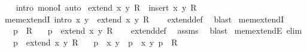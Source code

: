 \begin{isabellebody}
%
\isadelimproof
\ \ %
\endisadelimproof
%
\isatagproof
{}\isamarkupfalse%
\ {\isacharparenleft}{\kern0pt}intro\ monoI{\isacharparenright}{\kern0pt}\ auto%
\endisatagproof
{\isafoldproof}%
%
\isadelimproof
%
\endisadelimproof
%
\isadelimdocument
%
\endisadelimdocument
%
\isatagdocument
%
\isamarkuptrue%
%
\endisatagdocument
{\isafolddocument}%
%
\isadelimdocument
%
\endisadelimdocument
{}\isamarkupfalse%
\ {\isachardoublequoteopen}extend\ x\ y\ R\ {\isasymequiv}\ insert\ {\isasymlangle}x{\isacharcomma}{\kern0pt}\ y{\isasymrangle}\ R{\isachardoublequoteclose}\isanewline
\isanewline
{}\isamarkupfalse%
\ mem{\isacharunderscore}{\kern0pt}extendI\ {\isacharbrackleft}{\kern0pt}intro{\isacharbrackright}{\kern0pt}{\isacharcolon}{\kern0pt}\ {\isachardoublequoteopen}{\isasymlangle}x{\isacharcomma}{\kern0pt}\ y{\isasymrangle}\ {\isasymin}\ extend\ x\ y\ R{\isachardoublequoteclose}\isanewline
%
\isadelimproof
\ \ %
\endisadelimproof
%
\isatagproof
{}\isamarkupfalse%
\ extend{\isacharunderscore}{\kern0pt}def\ \isamarkupfalse%
\ blast%
\endisatagproof
{\isafoldproof}%
%
\isadelimproof
\isanewline
%
\endisadelimproof
\isanewline
{}\isamarkupfalse%
\ mem{\isacharunderscore}{\kern0pt}extendI{\isacharprime}{\kern0pt}{\isacharcolon}{\kern0pt}\isanewline
\ \ \ {\isachardoublequoteopen}p\ {\isasymin}\ R{\isachardoublequoteclose}\isanewline
\ \ \ {\isachardoublequoteopen}p\ {\isasymin}\ extend\ x\ y\ R{\isachardoublequoteclose}\isanewline
%
\isadelimproof
\ \ %
\endisadelimproof
%
\isatagproof
{}\isamarkupfalse%
\ extend{\isacharunderscore}{\kern0pt}def\ \isamarkupfalse%
\ assms\ \isamarkupfalse%
\ blast%
\endisatagproof
{\isafoldproof}%
%
\isadelimproof
\isanewline
%
\endisadelimproof
\isanewline
{}\isamarkupfalse%
\ mem{\isacharunderscore}{\kern0pt}extendE\ {\isacharbrackleft}{\kern0pt}elim{\isacharbrackright}{\kern0pt}{\isacharcolon}{\kern0pt}\isanewline
\ \ \ {\isachardoublequoteopen}p\ {\isasymin}\ extend\ x\ y\ R{\isachardoublequoteclose}\isanewline
\ \ \ {\isachardoublequoteopen}p\ {\isacharequal}{\kern0pt}\ {\isasymlangle}x{\isacharcomma}{\kern0pt}\ y{\isasymrangle}{\isachardoublequoteclose}\ {\isacharbar}{\kern0pt}\ {\isachardoublequoteopen}p\ {\isasymnoteq}\ {\isasymlangle}x{\isacharcomma}{\kern0pt}\ y{\isasymrangle}{\isachardoublequoteclose}\ {\isachardoublequoteopen}p\ {\isasymin}\ R{\isachardoublequoteclose}\isanewline

\end{isabellebody}
